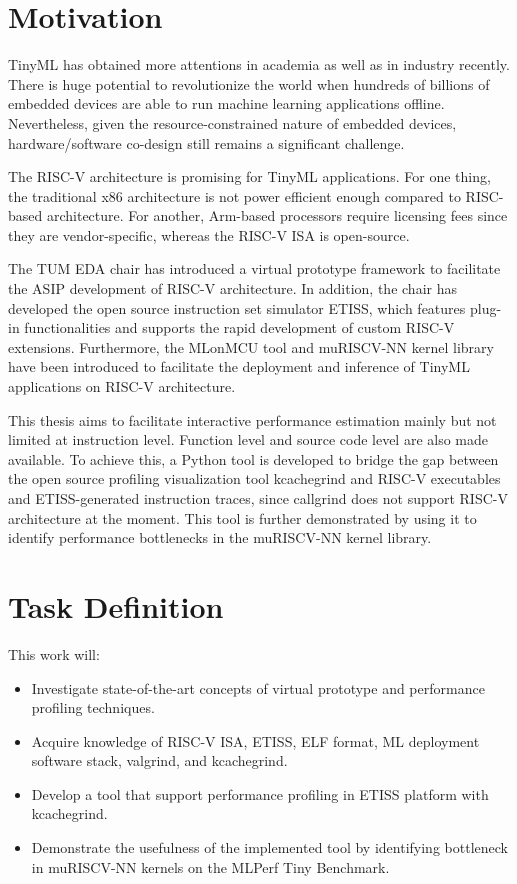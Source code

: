 
\section{Motivation}
\label{sec: motivation}

\ac{TinyML} has obtained more attentions in academia as well as in industry recently. There is huge potential to revolutionize the world when hundreds of billions of embedded devices are able to
run machine learning applications offline. Nevertheless, given the resource-constrained nature of embedded devices, hardware/software co-design still remains a significant challenge.

The RISC-V architecture is promising for \ac{TinyML} applications. For one thing, the traditional x86 architecture is not power efficient enough compared to RISC-based architecture.
For another, Arm-based processors require licensing fees since they are vendor-specific, whereas the RISC-V \ac{ISA} is open-source.

The TUM EDA chair has introduced a virtual prototype framework to facilitate the \ac{ASIP} development of RISC-V architecture. In addition, the chair has developed the open source instruction set simulator \ac{ETISS}, which features plug-in functionalities and supports the rapid development of custom RISC-V extensions\cite{ETISS}. Furthermore, the MLonMCU tool\cite{vankempen2023mlonmcu} and muRISCV-NN kernel library\cite{muriscvnn} have been introduced to facilitate the deployment and inference of \ac{TinyML} applications on RISC-V architecture. 

This thesis aims to facilitate interactive performance estimation mainly but not limited at instruction level. Function level and source code level are also made available. To achieve this, a Python tool is developed to bridge the gap between the open source profiling visualization tool kcachegrind and RISC-V executables and \ac{ETISS}-generated instruction traces, since callgrind does not support RISC-V architecture at the moment. This tool is further demonstrated by using it to identify performance bottlenecks in the muRISCV-NN kernel library. 

\section{Task Definition}

This work will:
\begin{itemize}
    \item Investigate state-of-the-art concepts of virtual prototype and performance profiling techniques. 
    \item Acquire knowledge of RISC-V \ac{ISA}, \ac{ETISS}, ELF format, ML deployment software stack, valgrind, and kcachegrind.
    \item Develop a tool that support performance profiling in \ac{ETISS} platform with kcachegrind.
    \item Demonstrate the usefulness of the implemented tool by identifying bottleneck in muRISCV-NN kernels on the MLPerf Tiny Benchmark.
\end{itemize}

